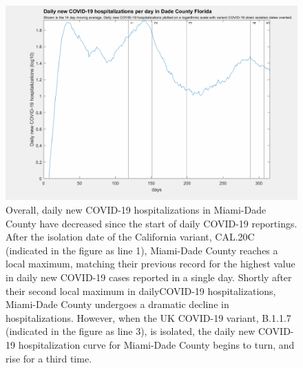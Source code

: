 \documentclass[]{article}
\begin{document}
\begin{figure}[!h]
	\includegraphics[width=\linewidth]{images/dade_hospitalizations_strains_log.png}
	\caption{Overall, daily new COVID-19 hospitalizations in Miami-Dade County have decreased since the start of daily COVID-19 reportings. After the isolation date of the California variant, CAL.20C (indicated in the figure as line 1), Miami-Dade County reaches a local maximum, matching their previous record for the highest value in daily new COVID-19 cases reported in a single day. Shortly after their second local maximum in dailyCOVID-19 hospitalizations, Miami-Dade County undergoes a dramatic decline in hospitalizations. However, when the UK COVID-19 variant, B.1.1.7 (indicated in the figure as line 3), is isolated, the daily new COVID-19 hospitalization curve for Miami-Dade County begins to turn, and rise for a third time.     }
	\label{fig:images/dade_hospitalizations_strains_logLabel}
\end{figure}
\end{document}
